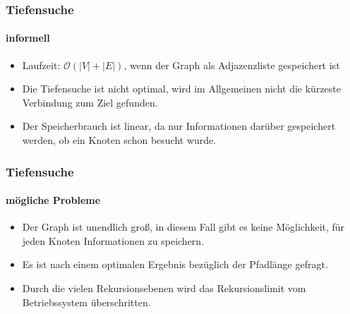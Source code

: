 
\begin{frame}
	\frametitle{Tiefensuche}
	\framesubtitle{informell}
	\begin{itemize}
		\item Laufzeit: $\mathcal{O}(|V| + |E|)$, wenn der Graph als Adjazenzliste gespeichert ist
		\item Die Tiefensuche ist nicht optimal, wird im Allgemeinen nicht die kürzeste Verbindung zum Ziel gefunden.
		\item Der Speicherbrauch ist linear, da nur Informationen darüber gespeichert werden, ob ein Knoten schon besucht wurde.
	\end{itemize}
\end{frame}

\begin{frame}
		\frametitle{Tiefensuche}
		\framesubtitle{mögliche Probleme}
		\begin{itemize}
			\item Der Graph ist unendlich groß, in diesem Fall gibt es keine Möglichkeit, für jeden Knoten Informationen zu speichern.
			\item Es ist nach einem optimalen Ergebnis bezüglich der Pfadlänge gefragt.
			\item Durch die vielen Rekursionsebenen wird das Rekursionslimit vom Betriebssystem überschritten.
		\end{itemize}
\end{frame}

